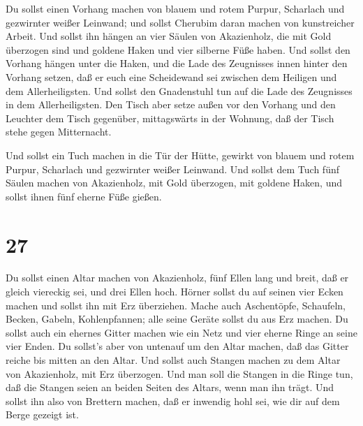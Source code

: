  Du sollst einen Vorhang machen von blauem und rotem
Purpur, Scharlach und gezwirnter weißer Leinwand; und sollst Cherubim
daran machen von kunstreicher Arbeit.  Und sollst ihn
hängen an vier Säulen von Akazienholz, die mit Gold überzogen sind und
goldene Haken und vier silberne Füße haben.  Und sollst den
Vorhang hängen unter die Haken, und die Lade des Zeugnisses innen hinter
den Vorhang setzen, daß er euch eine Scheidewand sei zwischen dem
Heiligen und dem Allerheiligsten.  Und sollst den
Gnadenstuhl tun auf die Lade des Zeugnisses in dem Allerheiligsten.
 Den Tisch aber setze außen vor den Vorhang und den
Leuchter dem Tisch gegenüber, mittagswärts in der Wohnung, daß der Tisch
stehe gegen Mitternacht.

 Und sollst ein Tuch machen in die Tür der Hütte, gewirkt
von blauem und rotem Purpur, Scharlach und gezwirnter weißer Leinwand.
 Und sollst dem Tuch fünf Säulen machen von Akazienholz,
mit Gold überzogen, mit goldene Haken, und sollst ihnen fünf eherne Füße
gießen.

\hypertarget{section-26}{%
\section{27}\label{section-26}}

 Du sollst einen Altar machen von Akazienholz, fünf Ellen
lang und breit, daß er gleich viereckig sei, und drei Ellen hoch.
 Hörner sollst du auf seinen vier Ecken machen und sollst
ihn mit Erz überziehen.  Mache auch Aschentöpfe, Schaufeln,
Becken, Gabeln, Kohlenpfannen; alle seine Geräte sollst du aus Erz
machen.  Du sollst auch ein ehernes Gitter machen wie ein
Netz und vier eherne Ringe an seine vier Enden.  Du sollst's
aber von untenauf um den Altar machen, daß das Gitter reiche bis mitten
an den Altar.  Und sollst auch Stangen machen zu dem Altar
von Akazienholz, mit Erz überzogen.  Und man soll die
Stangen in die Ringe tun, daß die Stangen seien an beiden Seiten des
Altars, wenn man ihn trägt.  Und sollst ihn also von
Brettern machen, daß er inwendig hohl sei, wie dir auf dem Berge gezeigt
ist.

